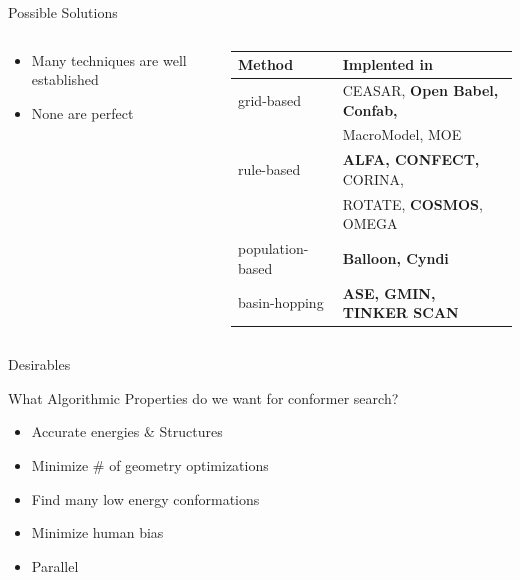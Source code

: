 \documentclass[10pt]{beamer}
\begin{document}
{%
\begin{frame}[fragile]{Possible Solutions}
	\begin{columns}[c] %
		\begin{column}{.4\textwidth}
			\begin{itemize}[<+->]
				\item {Many techniques are well established}
				\item {None are perfect}
			\end{itemize}
		\end{column}
		\hfill
		\begin{column}{.65\textwidth}
			\footnotesize
			\begin{tabular}{ l  l}
				Method & Implented in
				\\ \midrule
				grid-based & CEASAR, \textbf{Open Babel, Confab,} \\
				           & MacroModel, MOE  \\
				rule-based & \textbf{ALFA, CONFECT,} CORINA, \\
				           & ROTATE, \textbf{COSMOS}, OMEGA \\
				population-based & \textbf{Balloon, Cyndi} \\
				basin-hopping & \textbf{ASE, GMIN, TINKER SCAN} \\
			\end{tabular}
		\end{column}
	\end{columns}
\end{frame}
}

\begin{frame}{Desirables}
	\begin{block}{What Algorithmic Properties do we want for conformer search?}
		\begin{itemize}[<+->]
			\item[1.] Accurate energies \& Structures
			\item[2.] {Minimize \# of geometry optimizations}
			\item[3.] {Find many low energy conformations}
			\item[4.] {Minimize human bias}
			\item[5.] {Parallel}
		\end{itemize}
	\end{block}
\end{frame}
\end{document}
